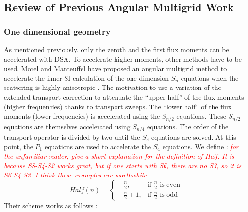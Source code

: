 \documentclass[preprint,10pt]{elsarticle}
\renewcommand{\(}{\left(}
\renewcommand{\)}{\right)}
\renewcommand{\[}{\left[}
\renewcommand{\]}{\right]}
\newcommand{\tri}[1]{\textcolor{red}{{\it #1}}}
\begin{document}
\subsection{Review of Previous Angular Multigrid Work} \label{sec:previous_anmg}

\subsubsection{One dimensional geometry}

As mentioned previously, only the zeroth and the first flux moments can be
accelerated with DSA. To accelerate higher moments, other methods have to be
used. Morel and Manteuffel have proposed an angular 
multigrid method to accelerate the inner SI calculation of the one dimension 
$S_n$ equations when the scattering is highly anisotropic 
\cite{multigrid_1d}. The motivation to use a variation of the extended
transport correction \cite{lathrop} to attenuate the ``upper half'' of the
flux moments (higher frequencies) thanks to transport sweeps. The ``lower half'' 
of the flux moments (lower frequencies) is accelerated using the $S_{n/2}$ 
equations. These $S_{n/2}$ equations are themselves 
accelerated using $S_{n/4}$ equations. The order of the transport operator is 
divided by two 
until the $S_4$ equations are solved. At this point, the $P_1$ equations are 
used to accelerate the $S_4$ equations. We define :
\tri{for the unfamiliar reader, give a short explanation for the definition of Half. It is because 
S8-S4-S2 works great, but if one starts with S6, there are no S3, so it is S6-S4-S2. I think these examples are worthwhile}
\begin{equation}
Half(n) = \left\{
\begin{aligned}
&\frac{n}{2}, &\textrm{if $\frac{n}{2}$ is even}\\
&\frac{n}{2}+1, &\textrm{if $\frac{n}{2}$ is odd}
\end{aligned}
\right.
\end{equation}
Their scheme works as follows : 
\end{document}
